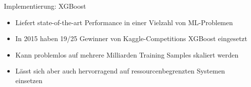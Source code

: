 \begin{frame}{Implementierung: XGBoost}
    \begin{itemize}
        \item Liefert state-of-the-art Performance in einer Vielzahl von ML-Problemen
        \item In 2015 haben 19/25 Gewinner von Kaggle-Competitions XGBoost eingesetzt
        \item Kann problemlos auf mehrere Milliarden Training Samples skaliert werden 
        \item L\"asst sich aber auch hervorragend auf ressourcenbegrenzten Systemen einsetzen \cite{XGBoost}
    \end{itemize}
\end{frame}